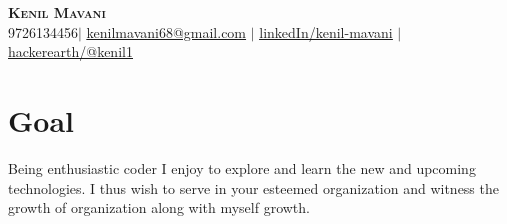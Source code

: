 \documentclass[]{resume-openfont}
\begin{document}
\newcommand{\yourName}{Kenil Mavani}
\newcommand{\yourWebsite}{}
\newcommand{\yourEmail}{kenilmavani68@gmail.com}
\newcommand{\yourPhone}{9726134456}
\newcommand{\hackerearthUserName}{@kenil1}
\newcommand{\linkedInUserName}{kenil-mavani}


\begin{center}
    \textbf{\Huge \scshape \yourName} \\ \vspace{1pt}
    \small \yourPhone $|$ \href{mailto:\yourEmail}{\underline{\yourEmail}} $|$ 
    \href{https://linkedin.com/in/\linkedInUserName}{\underline{linkedIn/\linkedInUserName}} $|$
    \href{https://hackerearth.com/\hackerearthUserName}{\underline{hackerearth/\hackerearthUserName}}
\end{center}

\section{Goal}
    Being enthusiastic coder I enjoy to explore and learn the new and upcoming technologies. I thus wish to serve in your esteemed organization and witness the growth of organization along with myself growth.\\
\sectionsep

\hspace{1cm}

\end{document}
